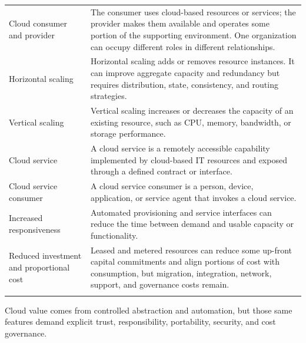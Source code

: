 \documentclass[11pt]{article}
\begin{document}
\begin{longtable}{@{}>{\RaggedRight\arraybackslash}p{}>{\RaggedRight\arraybackslash}p{}@{}}
Cloud consumer and provider & The consumer uses cloud-based resources or services; the provider makes them available and operates some portion of the supporting environment. One organization can occupy different roles in different relationships. \\\addlinespace[2pt]
Horizontal scaling & Horizontal scaling adds or removes resource instances. It can improve aggregate capacity and redundancy but requires distribution, state, consistency, and routing strategies. \\\addlinespace[2pt]
Vertical scaling & Vertical scaling increases or decreases the capacity of an existing resource, such as CPU, memory, bandwidth, or storage performance. \\\addlinespace[2pt]
Cloud service & A cloud service is a remotely accessible capability implemented by cloud-based IT resources and exposed through a defined contract or interface. \\\addlinespace[2pt]
Cloud service consumer & A cloud service consumer is a person, device, application, or service agent that invokes a cloud service. \\\addlinespace[2pt]
Increased responsiveness & Automated provisioning and service interfaces can reduce the time between demand and usable capacity or functionality. \\\addlinespace[2pt]
Reduced investment and proportional cost & Leased and metered resources can reduce some up-front capital commitments and align portions of cost with consumption, but migration, integration, network, support, and governance costs remain. \\\addlinespace[2pt]
\bottomrule
\end{longtable}
\begin{takeawaybox}
Cloud value comes from controlled abstraction and automation, but those same features demand explicit trust, responsibility, portability, security, and cost governance.
\end{takeawaybox}
\end{document}
